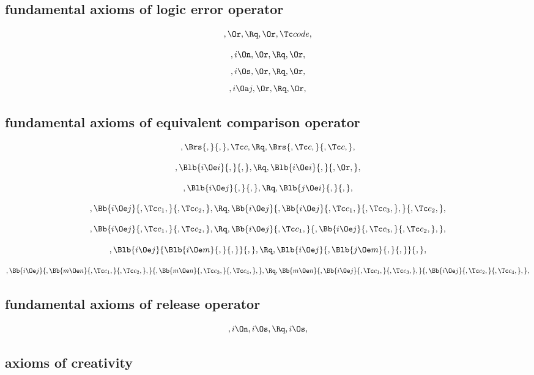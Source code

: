\bigskip
\subsection{fundamental axioms of logic error operator}

\[,\Or, \Rq ,\Or, \Tc code,\]


\[,i \On, \Or, \Rq ,\Or,\]
\[,i \Os, \Or, \Rq ,\Or,\]
\[,i \Oa j, \Or, \Rq ,\Or,\]



\bigskip
\subsection{ fundamental axioms of equivalent comparison operator}

\[,\Brs{,}{,} ,\Tc c, \Rq, \Brs{,\Tc c,}{,\Tc c,},\]

\bigskip

\[, \Blb{i \Oe i}{,}{,}, \Rq , \Blb{i \Oe i}{,}{, \Or,},\]


\bigskip

\[, \Blb{i \Oe j}{,}{,}, \Rq , \Blb{j \Oe i}{,}{,},\]


\bigskip

\[, \Bb{i \Oe j}{,\Tc c_1,}{,\Tc c_2,}, \Rq , \Bb{i \Oe j}{, \Bb{i \Oe j}{,\Tc c_1,}{,\Tc c_3,},}{,\Tc c_2,} ,\]

\bigskip

\[, \Bb{i \Oe j}{,\Tc c_1,}{,\Tc c_2,}, \Rq , \Bb{i \Oe j}{, \Tc c_1,}{,\Bb{i \Oe j}{,\Tc c_3,}{,\Tc c_2,},} ,\]


\bigskip

\[, \Blb{i \Oe j}{ \Blb{i \Oe m}{,}{,}}{,}, \Rq , \Blb{i \Oe j}{, \Blb{j \Oe m}{,}{,}}{,}, \]


\bigskip
\[, \Bb{i \Oe j}{,\Bb{m \Oe n}{,\Tc c_1,}{,\Tc c_2,},}{, \Bb{m \Oe n}{,\Tc c_3,}{,\Tc c_4,},}, \Rq ,  \Bb{m \Oe n}{,\Bb{i \Oe j}{,\Tc c_1,}{,\Tc c_3,},}{, \Bb{i \Oe j}{,\Tc c_2,}{,\Tc c_4,},},\]


\bigskip
\subsection{fundamental axioms of release operator}

\[,i \On ,i \Os , \Rq ,i \Os,\]



\bigskip
\subsection{axioms of creativity}

